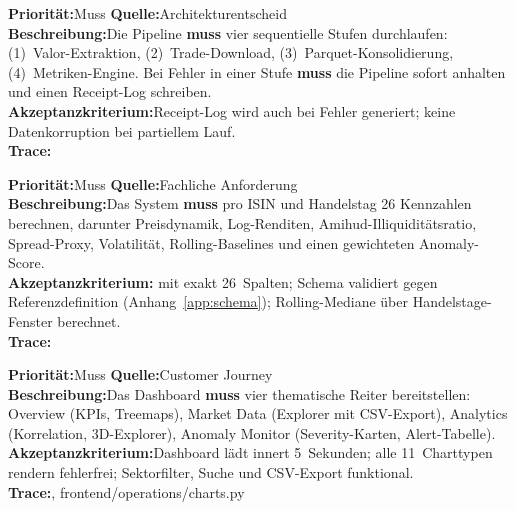 \documentclass[11pt, a4paper, oneside, openany]{report}
\newcommand{\code}[1]{{\codefont\small\textcolor{DeepNavy}{#1}}}
\begin{document}
\vspace{6pt}

\begin{reqbox}
\textbf{Priorität:}\;Muss \quad \textbf{Quelle:}\;Architekturentscheid \\[4pt]
\textbf{Beschreibung:}\;Die Pipeline \textbf{muss} vier sequentielle Stufen durchlaufen: (1)~Valor-Extraktion, (2)~Trade-Download, (3)~Parquet-Konsolidierung, (4)~Metriken-Engine. Bei Fehler in einer Stufe \textbf{muss} die Pipeline sofort anhalten und einen Receipt-Log schreiben. \\[4pt]
\textbf{Akzeptanzkriterium:}\;Receipt-Log wird auch bei Fehler generiert; keine Datenkorruption bei partiellem Lauf. \\[4pt]
\textbf{Trace:}\;\code{backend/pipeline.py}
\end{reqbox}

\vspace{6pt}

\begin{reqbox}
\textbf{Priorität:}\;Muss \quad \textbf{Quelle:}\;Fachliche Anforderung \\[4pt]
\textbf{Beschreibung:}\;Das System \textbf{muss} pro ISIN und Handelstag 26 Kennzahlen berechnen, darunter Preisdynamik, Log-Renditen, Amihud-Illiquiditätsratio, Spread-Proxy, Volatilität, Rolling-Baselines und einen gewichteten Anomaly-Score. \\[4pt]
\textbf{Akzeptanzkriterium:}\;\code{daily\_metrics.parquet} mit exakt 26~Spalten; Schema validiert gegen Referenzdefinition (Anhang~\ref{app:schema}); Rolling-Mediane über Handelstage-Fenster berechnet. \\[4pt]
\textbf{Trace:}\;\code{backend/operations/metrics.py}
\end{reqbox}

\vspace{6pt}

\begin{reqbox}
\textbf{Priorität:}\;Muss \quad \textbf{Quelle:}\;Customer Journey \\[4pt]
\textbf{Beschreibung:}\;Das Dashboard \textbf{muss} vier thematische Reiter bereitstellen: Overview (KPIs, Treemaps), Market Data (Explorer mit CSV-Export), Analytics (Korrelation, 3D-Explorer), Anomaly Monitor (Severity-Karten, Alert-Tabelle). \\[4pt]
\textbf{Akzeptanzkriterium:}\;Dashboard lädt innert 5~Sekunden; alle 11~Charttypen rendern fehlerfrei; Sektorfilter, Suche und CSV-Export funktional. \\[4pt]
\textbf{Trace:}\;\code{frontend/app.py}, \code{frontend/operations/charts.py}
\end{reqbox}
\end{document}
